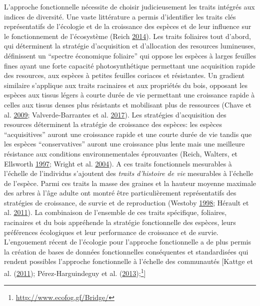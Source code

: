 \documentclass[11pt,french,A4paper,extrafontsizes,onecolumn,openright]{memoir}
\let\rmarkdownfootnote\footnote%
\def\footnote{\protect\rmarkdownfootnote}
\begin{document}
L'approche fonctionnelle nécessite de choisir judicieusement les traits
intégrés aux indices de diversité. Une vaste littérature a permis
d'identifier les traits clés représentatifs de l'écologie et de la
croissance des espèces et de leur influence sur le fonctionnement de
l'écosystème (Reich \protect\hyperlink{ref-Reich2014}{2014}). Les traits
foliaires tout d'abord, qui déterminent la stratégie d'acquisition et
d'allocation des resources lumineuses, définissent un ``spectre
économique foliaire'' qui oppose les espèces à larges feuilles fines
ayant une forte capacité photosynthétique permettant une acquisition
rapide des resources, aux espèces à petites feuilles coriaces et
résistantes. Un gradient similaire s'applique aux traits racinaires et
aux propriétés du bois, opposant les espèces aux tissus légers à courte
durée de vie permettant une croissance rapide à celles aux tissus denses
plus résistants et mobilisant plus de ressources (Chave et al.
\protect\hyperlink{ref-Chave2009}{2009}; Valverde-Barrantes et al.
\protect\hyperlink{ref-Valverde-Barrantes2017}{2017}). Les stratégies
d'acquisition des resources déterminent la stratégie de croissance des
espèces: les espèces ``acquisitives'' auront une croissance rapide et
une courte durée de vie tandis que les espèces ``conservatives'' auront
une croissance plus lente mais une meilleure résistance aux conditions
environnementales éprouvantes (Reich, Walters, et Ellsworth
\protect\hyperlink{ref-Reich1997}{1997}; Wright et al.
\protect\hyperlink{ref-Wright2004}{2004}). A ces traits fonctionnels
mesurables à l'échelle de l'individus s'ajoutent des \emph{traits
d'histoire de vie} mesurables à l'échelle de l'espèce. Parmi ces traits
la masse des graines et la hauteur moyenne maximale des arbres à l'âge
adulte ont montré être particulièrement représentatifs des stratégies de
croissance, de survie et de reproduction (Westoby
\protect\hyperlink{ref-Westoby1998}{1998}; Hérault et al.
\protect\hyperlink{ref-Herault2011}{2011}). La combinaison de l'ensemble
de ces traits spécifique, foliaires, racinaires et du bois appréhende la
stratégie fonctionnelle des espèces, leurs préférences écologiques et
leur performance de croissance et de survie. L'engouement récent de
l'écologie pour l'approche fonctionnelle a de plus permis la création de
bases de données fonctionnelles conséquentes et standardisées qui
rendent possibles l'approche fonctionnelle à l'échelle des communautés
{[}Kattge et al. (\protect\hyperlink{ref-Kattge2011}{2011});
Pérez-Harguindeguy et al.
(\protect\hyperlink{ref-Perez-Harguindeguy2013}{2013});\footnote{\url{http://www.ecofog.gf/Bridge/}}{]}
\end{document}
